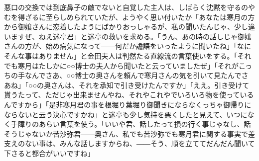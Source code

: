 \documentclass[12pt, openright]{book}
\begin{document}
悪口の交換では到底鼻子の敵でないと自覚した主人は、しばらく沈黙を守るのやむを得ざるに至らしめられていたが、ようやく思い付いたか「あなたは寒月の方から御嬢さんに恋着したようにばかりおっしゃるが、私の聞いたんじゃ、少し違いますぜ、ねえ迷亭君」と迷亭の救いを求める。「うん、あの時の話しじゃ御嬢さんの方が、始め病気になって――何だか譫語をいったように聞いたね」「なにそんな事はありません」と金田夫人は判然たる直線流の言葉使いをする。「それでも寒月はたしかに○○博士の夫人から聞いたと云っていましたぜ」「それがこっちの手なんでさあ、○○博士の奥さんを頼んで寒月さんの気を引いて見たんでさあね」「○○の奥さんは、それを承知で引き受けたんですか」「ええ。引き受けて貰うたって、ただじゃ出来ませんやね、それやこれやでいろいろ物を使っているんですから」「是非寒月君の事を根堀り葉堀り御聞きにならなくっちゃ御帰りにならないと云う決心ですかね」と迷亭も少し気持を悪くしたと見えて、いつになく手障りのあらい言葉を使う。「いいや君、話したって損の行く事じゃなし、話そうじゃないか苦沙弥君――奥さん、私でも苦沙弥でも寒月君に関する事実で差支えのない事は、みんな話しますからね、――そう、順を立ててだんだん聞いて下さると都合がいいですね」
\end{document}
